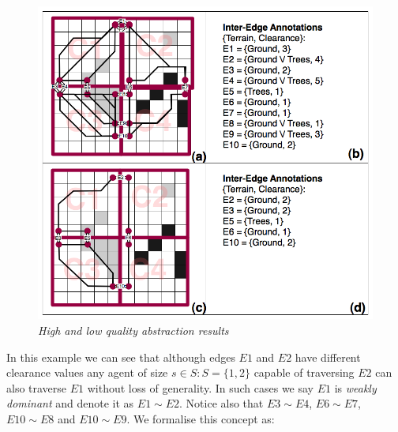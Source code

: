 \begin{figure}[htbp]
	\vspace{-12pt}
        \caption{\emph{High and low quality abstraction results} }
        \begin{center}
                        \includegraphics[scale=0.25, trim = 20mm 12mm 20mm 5mm]{diagrams/abstraction_result.png}
        \end{center}
        \label{aha-fig:abstractgraph}
	\vspace{-6pt}
\end{figure}
\par \indent
In this example we can see that although edges $E1$ and $E2$ have different clearance values any agent of size $s \in S : S = \lbrace 1, 2 \rbrace$ capable of traversing $E2$ can also traverse $E1$ without loss of generality. 
In such cases we say $E1$ is \emph{weakly dominant} and denote it as $E1 \sim E2$. 
Notice also that $E3 \sim E4$, $E6 \sim E7$, $E10 \sim E8$ and $E10 \sim E9$.
We formalise this concept as:
